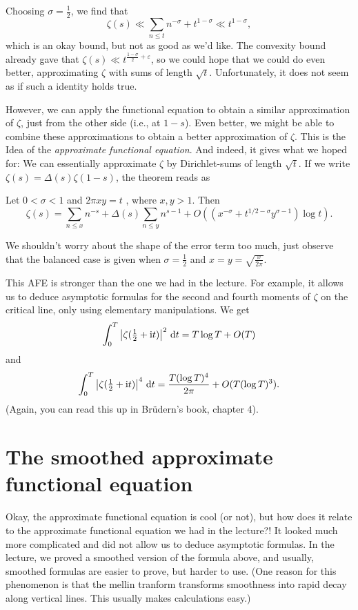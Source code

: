 \documentclass[a4paper,11pt]{article}
\begin{document}
Choosing $\sigma = \frac 12$, we find that 
\[
    \zeta(s) \ll \sum_{n \leq t} n^{-\sigma} + t^{1-\sigma} \ll t^{1- \sigma},
\]
which is an okay bound, but not as good as we'd like. The convexity bound already 
gave that $\zeta(s) \ll t^{\frac{1-\sigma}2 + \varepsilon}$, so we could hope 
that we could do even better, approximating $\zeta$ with sums of length $\sqrt t$.
Unfortunately, it does not seem as if such a identity holds true. 

However, we can apply the functional equation to obtain a similar approximation
of $\zeta$, just from the other side (i.e., at $1-s$). Even better, we might be
able to combine these approximations to obtain a better approximation of 
$\zeta$. This is the Idea of the \textit{approximate functional equation}. 
And indeed, it gives what we hoped for: We can essentially approximate $\zeta$ by
Dirichlet-sums of length $\sqrt t$. If we write $\zeta(s) = \Delta(s) \zeta(1-s)$,
the theorem reads as
\begin{thm}
    Let $0 < \sigma < 1$ and $2 \pi xy = t$ , where $x,y > 1$. Then
    \[
    \zeta(s) = \sum_{n \leq x}n^{-s} + \Delta(s) \sum_{n \leq y} n^{s-1} 
    + O((x^{-\sigma} + t^{1/2-\sigma} y^{\sigma-1}) \log t).
    \]
\end{thm}
We shouldn't worry about the shape of the error term too much, just observe that 
the balanced case is given when $\sigma = \frac 12$ and $x=y= \sqrt{\frac x
{2\pi}}.$ 

This AFE is stronger than the one we had in the lecture. For example, it allows
us to deduce asymptotic formulas for the second and fourth moments of $\zeta$
on the critical line, only using elementary manipulations. We get
\[
    \int_0^T \left\lvert \zeta(\tfrac 12 + \mathrm i t) \right\rvert^2 \mathrm{\,d} t = T \log T + O(T)
\]
and 
\[
    \int_0^T \left\lvert \zeta(\tfrac 12 + \mathrm i t) \right\rvert^4 \mathrm{\,d} t = \frac{T (\log T)^4}{2\pi} + 
    O(T(\log T)^3).
\]
(Again, you can read this up in Brüdern's book, chapter 4).



\section{The smoothed approximate functional equation} %
\label{sec:Our approximate functional equation}
Okay, the approximate functional equation is cool (or not), but how does it relate
to the approximate functional equation we had in the lecture?! It looked much
more complicated and did not
allow us to deduce asymptotic formulas. In the lecture, we proved a smoothed
version of the formula above, and usually, smoothed formulas are easier to
prove, but harder to use. (One reason for this phenomenon is that 
the mellin tranform transforms smoothness into rapid
decay along vertical lines. This usually makes calculations easy.)
\end{document}
